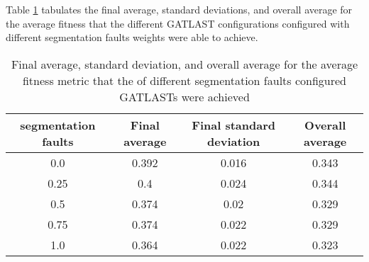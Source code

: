 Table \ref{tab:HP:GA:SegFault:average fitness} tabulates the final average, standard deviations, and overall average for the average fitness that the different GATLAST configurations configured with different segmentation faults weights were able to achieve.
\begin{table}[tbh!]
\centering
\begin{adjustbox}{trim=0cm 0cm 0cm 0cm, clip=true}
\begin{tabular}{|c|c|c|c|}
\hline
segmentation faults & Final average & Final standard deviation & Overall average\\
\hline
0.0 & 0.392 & 0.016 & 0.343\\\hline
0.25 & 0.4 & 0.024 & 0.344\\\hline
0.5 & 0.374 & 0.02 & 0.329\\\hline
0.75 & 0.374 & 0.022 & 0.329\\\hline
1.0 & 0.364 & 0.022 & 0.323\\\hline
\end{tabular}
\end{adjustbox}
\caption{Final average, standard deviation, and overall average for the average fitness metric that the of different segmentation faults configured GATLASTs were achieved}
\label{tab:HP:GA:SegFault:average fitness}
\end{table}